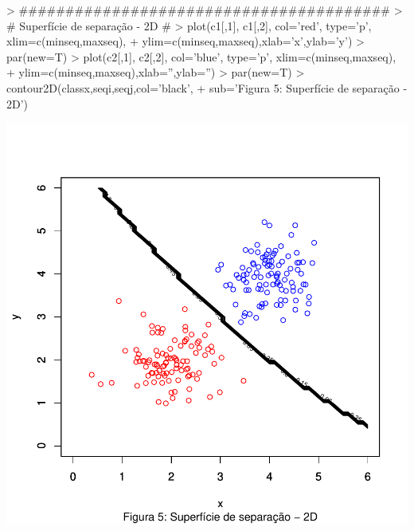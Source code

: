 \documentclass{article}
\begin{document}
\begin{Schunk}
\begin{Sinput}
> ########################################
> # Superfície de separação - 2D #
> plot(c1[,1], c1[,2], col='red', type='p', xlim=c(minseq,maxseq), 
+      ylim=c(minseq,maxseq),xlab='x',ylab='y')
> par(new=T)
> plot(c2[,1], c2[,2], col='blue', type='p', xlim=c(minseq,maxseq), 
+      ylim=c(minseq,maxseq),xlab='',ylab='')
> par(new=T)
> contour2D(classx,seqi,seqj,col='black',
+            sub='Figura 5: Superfície de separação - 2D')
\end{Sinput}
\end{Schunk}
\includegraphics{gaussr2-006}
\end{document}
